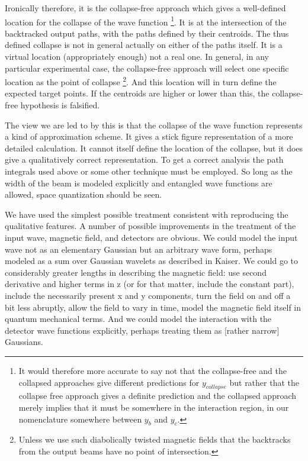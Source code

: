 \documentclass[aps,prl,superscriptaddress,12pt]{revtex4-2}
\begin{document}
Ironically therefore, it is the collapse-free approach 
	which gives a well-defined location for the collapse of the wave function
\footnote{It would therefore more accurate to say not that the collapse-free 
	and the collapsed approaches give different predictions for $y_{collapse}$
	but rather that the collapse free approach gives a definite prediction
	and the collapsed approach merely implies that it must be somewhere 
	in the interaction region, 
	in our nomenclature somewhere between $y_b$ and $y_c$.}.
It is at the intersection of the backtracked output paths, 
	with the paths defined by their centroids. 
The thus defined collapse is not in general actually on either of the paths itself. 
It is a virtual location (appropriately enough) not a real one. 
In general, in any particular experimental case, 
	the collapse-free approach will select one specific location as the point of collapse
	\footnote{Unless we use such diabolically twisted magnetic fields 
		that the backtracks from the output beams have no point of intersection.}.
And this location will in turn define the expected target points. If the centroids are higher or lower than this, the collapse-free hypothesis is falsified.

The view we are led to by this is that 
	the collapse of the wave function represents a kind of approximation scheme. 
It gives a stick figure representation of a more detailed calculation. 
It cannot itself define the location of the collapse, but it does give a qualitatively correct representation. 
To get a correct analysis the path integrals used above or some other technique must be employed. 
So long as the width of the beam is modeled explicitly and entangled wave functions are allowed, space quantization should be seen.

We have used the simplest possible treatment consistent with reproducing the qualitative features. 
A number of possible improvements in the treatment of the input wave, magnetic field, and detectors are obvious. 
We could model the input wave not as an elementary Gaussian but an arbitrary wave form, perhaps modeled as a sum over Gaussian wavelets as described in Kaiser\cite{Kaiser:1994}. 
We could go to considerably greater lengths in describing the magnetic field: use second derivative and higher terms in z (or for that matter, include the constant part), include the necessarily present x and y components, turn the field on and off a bit less abruptly, allow the field to vary in time, model the magnetic field itself in quantum mechanical terms. 
And we could model the interaction with the detector wave functions explicitly, perhaps treating them as [rather narrow] Gaussians.
\end{document}
